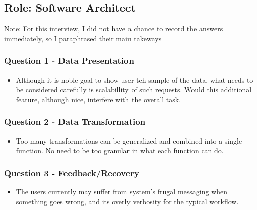\documentclass[12pt,letterpaper]{article}
\begin{document}
\subsection*{Role: Software Architect}

Note: For this interview, I did not have a chance to record the answers immediately, so I paraphrased their main takeways
\subsubsection*{Question 1 - Data Presentation}

\begin{itemize}
    \item Although it is noble goal to show user teh sample of the data, what needs to be considered carefully is scalabillity of such requests. Would this additional feature, although nice, interfere with the overall task.  
\end{itemize}

\subsubsection*{Question 2 - Data Transformation}
\begin{itemize}
    \item Too many transformations can be generalized and combined into a single function. No need to be too granular in what each function can do.  
\end{itemize}

\subsubsection*{Question 3 - Feedback/Recovery}
\begin{itemize}
    \item The users currently may suffer from system's frugal messaging when something goes wrong, and its overly verbosity for the typical workflow.
\end{itemize}
\end{document}
